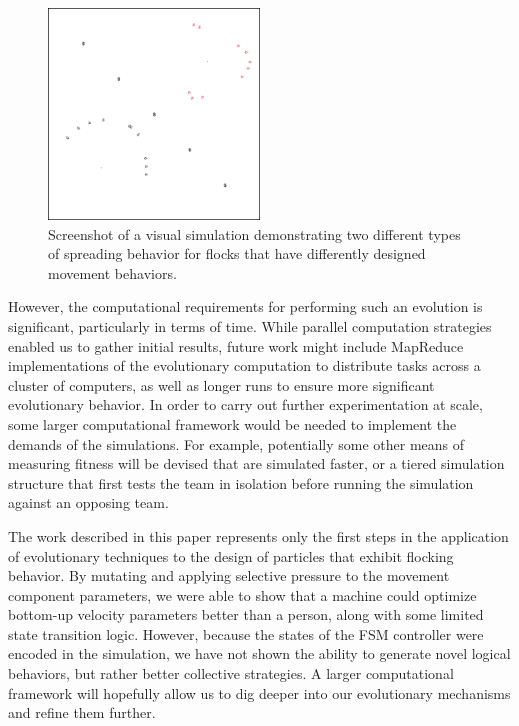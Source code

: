 \documentclass[conference,final]{IEEEtran}
\begin{document}
\begin{figure}[t!]
	\centering
    	\includegraphics[width=0.5\textwidth]{figures/spreading}
    \caption{Screenshot of a visual simulation demonstrating two different types of spreading behavior for flocks that have differently designed movement behaviors.}
    \label{fig:spreading}
\end{figure}

However, the computational requirements for performing such an evolution is significant, particularly in terms of time. While parallel computation strategies enabled us to gather initial results, future work might include MapReduce implementations of the evolutionary computation to distribute tasks across a cluster of computers, as well as longer runs to ensure more significant evolutionary behavior. In order to carry out further experimentation at scale, some larger computational framework would be needed to implement the demands of the simulations. For example, potentially some other means of measuring fitness will be devised that are simulated faster, or a tiered simulation structure that first tests the team in isolation before running the simulation against an opposing team.

The work described in this paper represents only the first steps in the application of evolutionary techniques to the design of particles that exhibit flocking behavior. By mutating and applying selective pressure to the movement component parameters, we were able to show that a machine could optimize bottom-up velocity parameters better than a person, along with some limited state transition logic. However, because the states of the FSM controller were encoded in the simulation, we have not shown the ability to generate novel logical behaviors, but rather better collective strategies. A larger computational framework will hopefully allow us to dig deeper into our evolutionary mechanisms and refine them further.
\end{document}
